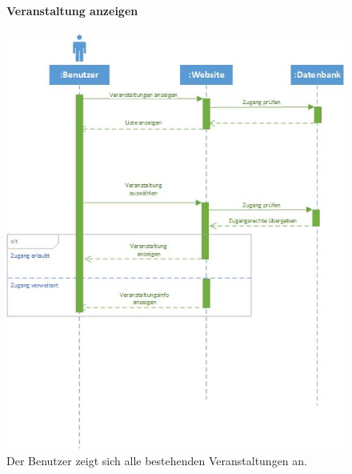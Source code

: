\documentclass[12pt,a4paper]{article}
\begin{document}
\begin{figure}[H]
	\centering
	\paragraph{Veranstaltung anzeigen}
	\includegraphics[width=\textwidth]{Bilder/Sequenzdiagramme/VeranstaltungenAnzeigen1.jpg}
	\caption{Der Benutzer zeigt sich alle bestehenden Veranstaltungen an.}
	\label{SzVeranstaltungenAnzeigen}
\end{figure}
\end{document}
